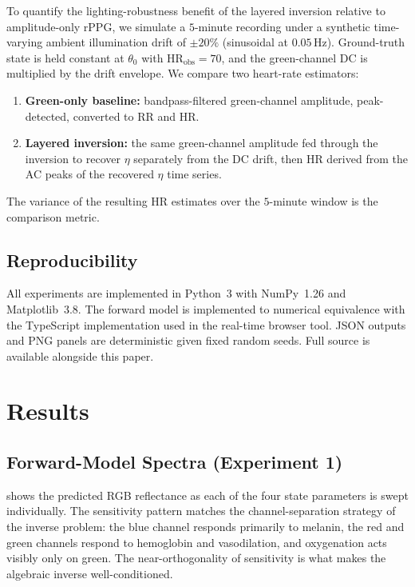 \documentclass[10pt,twocolumn,a4paper]{article}
\theoremstyle{definition}
\newcommand{\HRobs}{\mathrm{HR}_{\mathrm{obs}}}
\newcommand{\vaso}{\eta}
\begin{document}
To quantify the lighting-robustness benefit of the layered inversion
relative to amplitude-only rPPG, we simulate a $5$-minute recording
under a synthetic time-varying ambient illumination drift of
$\pm 20\%$ (sinusoidal at $0.05\,\mathrm{Hz}$). Ground-truth state is
held constant at $\theta_{0}$ with $\HRobs=70$, and the green-channel
DC is multiplied by the drift envelope. We compare two heart-rate
estimators:
\begin{enumerate}[label=(\alph*),nosep]
\item \textbf{Green-only baseline:} bandpass-filtered green-channel
  amplitude, peak-detected, converted to RR and HR.
\item \textbf{Layered inversion:} the same green-channel amplitude
  fed through the inversion to recover $\vaso$ separately from the DC
  drift, then HR derived from the AC peaks of the recovered $\vaso$
  time series.
\end{enumerate}
The variance of the resulting HR estimates over the $5$-minute window
is the comparison metric.

\subsection{Reproducibility}

All experiments are implemented in Python~3 with NumPy~1.26 and
Matplotlib~3.8. The forward model is implemented to numerical
equivalence with the TypeScript implementation used in the real-time
browser tool. JSON outputs and PNG panels are deterministic given
fixed random seeds. Full source is available alongside this paper.

\section{Results}\label{sec:results}

\subsection{Forward-Model Spectra (Experiment 1)}

 shows the predicted RGB reflectance as
each of the four state parameters is swept individually. The
sensitivity pattern matches the channel-separation strategy of the
inverse problem: the blue channel responds primarily to melanin, the
red and green channels respond to hemoglobin and vasodilation, and
oxygenation acts visibly only on green. The near-orthogonality of
sensitivity is what makes the algebraic inverse well-conditioned.
\end{document}

